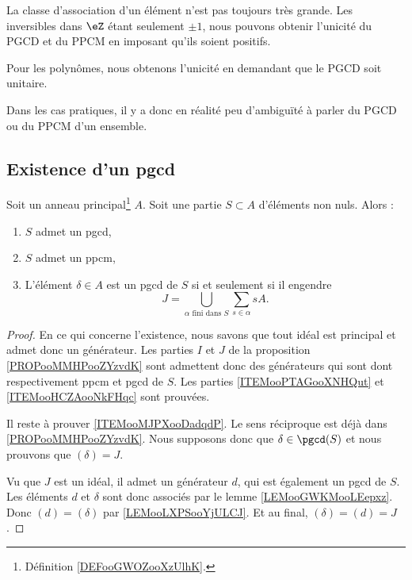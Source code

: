 \begin{remark}
	La classe d'association d'un élément n'est pas toujours très grande. Les inversibles dans \( \eZ\) étant seulement \( \pm 1\), nous pouvons obtenir l'unicité du PGCD et du PPCM en imposant qu'ils soient positifs.

	Pour les polynômes, nous obtenons l'unicité en demandant que le PGCD soit unitaire.

	Dans les cas pratiques, il y a donc en réalité peu d'ambiguïté à parler du PGCD ou du PPCM d'un ensemble.
\end{remark}


\subsection{Existence d'un pgcd}


\begin{proposition}	\label{PROPooPZXNooNpVZCm}
	Soit un anneau principal\footnote{Définition \ref{DEFooGWOZooXzUlhK}.} \( A\). Soit une partie \( S\subset A\) d'éléments non nuls. Alors :
	\begin{enumerate}
		\item		\label{ITEMooPTAGooXNHQut}
		      \( S\) admet un pgcd,
		\item		\label{ITEMooHCZAooNkFHqc}
		      \( S\) admet un ppcm,
		\item		\label{ITEMooMJPXooDadqdP}
		      L'élément \( \delta\in A\) est un pgcd de \( S\) si et seulement si il engendre
		      \begin{equation}
			      J=\bigcup_{\alpha\text{ fini dans } S}\sum_{s\in \alpha}sA.
		      \end{equation}
	\end{enumerate}
\end{proposition}

\begin{proof}
	En ce qui concerne l'existence, nous savons que tout idéal est principal et admet donc un générateur. Les parties \( I\) et \( J\) de la proposition \ref{PROPooMMHPooZYzvdK} sont admettent donc des générateurs qui sont dont respectivement ppcm et pgcd de \( S\). Les parties \ref{ITEMooPTAGooXNHQut} et \ref{ITEMooHCZAooNkFHqc} sont prouvées.

	Il reste à prouver \ref{ITEMooMJPXooDadqdP}. Le sens réciproque est déjà dans \ref{PROPooMMHPooZYzvdK}. Nous supposons donc que \( \delta\in\pgcd(S)\) et nous prouvons que \( (\delta)=J\).

	Vu que \( J\) est un idéal, il admet un générateur \( d\), qui est également un pgcd de \( S\). Les éléments \( d\) et \( \delta\) sont donc associés par le lemme \ref{LEMooGWKMooLEepxz}. Donc \( (d)=(\delta)\) par \ref{LEMooLXPSooYjULCJ}. Et au final, \( (\delta)=(d)=J\).
\end{proof}

